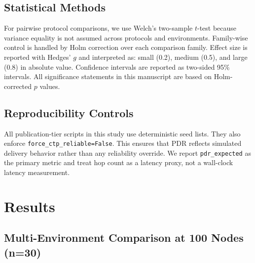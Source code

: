 \documentclass[sensors,article,submit,moreauthors,pdftex]{Definitions/mdpi}
\begin{document}
\subsection{Statistical Methods}
For pairwise protocol comparisons, we use Welch's two-sample $t$-test because variance equality is not assumed across protocols and environments. Family-wise control is handled by Holm correction over each comparison family. Effect size is reported with Hedges' $g$ and interpreted as: small (0.2), medium (0.5), and large (0.8) in absolute value. Confidence intervals are reported as two-sided 95\% intervals. All significance statements in this manuscript are based on Holm-corrected $p$ values.

\subsection{Reproducibility Controls}
All publication-tier scripts in this study use deterministic seed lists. They also enforce \texttt{force\_ctp\_reliable=False}. This ensures that PDR reflects simulated delivery behavior rather than any reliability override. We report \texttt{pdr\_expected} as the primary metric and treat hop count as a latency proxy, not a wall-clock latency measurement.

\section{Results}
\subsection{Multi-Environment Comparison at 100 Nodes (n=30)}
\begin{table}[H]
\caption{PDR by environment at 100 nodes (mean $\pm$ std; std reported as population standard deviation, ddof=0).}
\label{tab:pdr100}
\centering
{}
\end{table}
\end{document}
